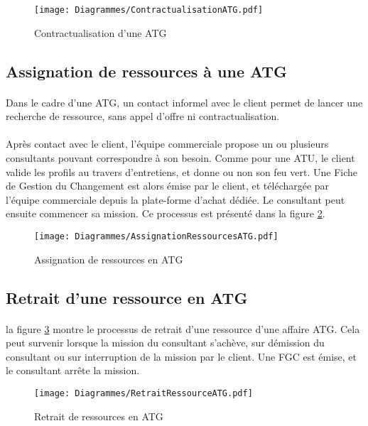 \begin{figure}[H]
	\centering
	\texttt{[image: Diagrammes/ContractualisationATG.pdf]}
	\caption{Contractualisation d'une ATG} 
	\label{contratATG}
\end{figure}



\subsection{Assignation de ressources à une ATG}

\paragraph{} Dans le cadre d'une ATG, un contact informel avec le client permet de lancer une recherche de ressource, sans appel d'offre ni contractualisation.
\paragraph{}Après contact avec le client, l'équipe commerciale propose un ou plusieurs consultants pouvant correspondre à son besoin. Comme pour une ATU, le client valide les profils au travers d'entretiens, et donne ou non son feu vert. Une Fiche de Gestion du Changement est alors émise par le client, et téléchargée par l'équipe commerciale depuis la plate-forme d'achat dédiée. Le consultant peut ensuite commencer sa mission.
Ce processus est présenté dans la figure \ref{asgnRcesATG}.

\begin{figure}[H]
	\centering
	\texttt{[image: Diagrammes/AssignationRessourcesATG.pdf]}
	\caption{Assignation de ressources en ATG} 
	\label{asgnRcesATG}
\end{figure}


\subsection{Retrait d'une ressource en ATG}
\paragraph{} la figure \ref{retraitATG} montre le processus de retrait d'une ressource d'une affaire ATG. Cela peut survenir lorsque la mission du consultant s'achève, sur démission du consultant ou sur interruption de la mission par le client. Une FGC est émise, et le consultant arrête la mission.


\begin{figure}[H]
	\centering
	\texttt{[image: Diagrammes/RetraitRessourceATG.pdf]}
	\caption{Retrait de ressources en ATG} 
	\label{retraitATG}
\end{figure}
